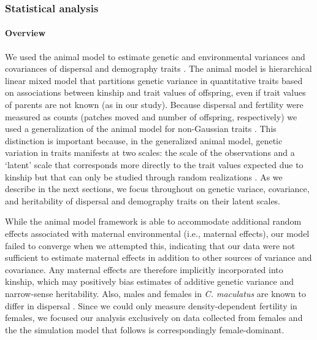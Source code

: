 \documentclass[11pt]{article}
\begin{document}
\subsubsection*{Statistical analysis}
\paragraph{Overview}
We used the animal model to estimate genetic and environmental variances and covariances of dispersal and demography traits \citep{lynch_genetics_1998,kruuk_estimating_2004,wilson_ecologists_2010}.
The animal model is hierarchical linear mixed model that partitions genetic variance in quantitative traits based on associations between kinship and trait values of offspring, even if trait values of parents are not known (as in our study).
Because dispersal and fertility were measured as counts (patches moved and number of offspring, respectively) we used a generalization of the animal model for non-Gaussian traits \citep{de2016general}.
This distinction is important because, in the generalized animal model, genetic variation in traits manifests at two scales: the scale of the observations and a `latent' scale that corresponds more directly to the trait values expected due to kinship but that can only be studied through random realizations \citep{de2016general}.
As we describe in the next sections, we focus throughout on genetic variace, covariance, and heritability of dispersal and demography traits on their latent scales.

While the animal model framework is able to accommodate additional random effects associated with maternal environmental (i.e., maternal effects), our model failed to converge when we attempted this, indicating that our data were not sufficient to estimate maternal effects in addition to other sources of variance and covariance.
Any maternal effects are therefore implicitly incorporated into kinship, which may positively bias estimates of additive genetic variance and narrow-sense heritability.
Also, males and females in \textit{C. maculatus} are known to differ in dispersal \citep{miller_sex_2013,ochocki_rapid_2017}.
Since we could only measure density-dependent fertility in females, we focused our analysis exclusively on data collected from females and the the simulation model that follows is correspondingly female-dominant.
\end{document}
